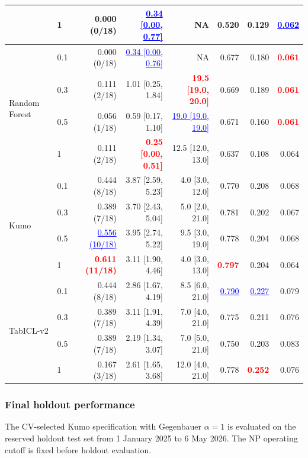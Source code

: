 \documentclass[a4paper,fleqn]{cas-sc}
\begin{document}
\begin{table}[pos=!htbp,align=\centering]
{\begin{tabular}{llrrrrrr}
 & 1 & 0.000 (0/18) & \textcolor{blue}{\underline{0.34 [0.00, 0.77]}} & NA & 0.520 & 0.129 & \textcolor{blue}{\underline{0.062}} \\
\midrule
\multirow{4}{*}{Random Forest} & 0.1 & 0.000 (0/18) & \textcolor{blue}{\underline{0.34 [0.00, 0.76]}} & NA & 0.677 & 0.180 & \textcolor{red}{\textbf{0.061}} \\
 & 0.3 & 0.111 (2/18) & 1.01 [0.25, 1.84] & \textcolor{red}{\textbf{19.5 [19.0, 20.0]}} & 0.669 & 0.189 & \textcolor{red}{\textbf{0.061}} \\
 & 0.5 & 0.056 (1/18) & 0.59 [0.17, 1.10] & \textcolor{blue}{\underline{19.0 [19.0, 19.0]}} & 0.671 & 0.160 & \textcolor{red}{\textbf{0.061}} \\
 & 1 & 0.111 (2/18) & \textcolor{red}{\textbf{0.25 [0.00, 0.51]}} & 12.5 [12.0, 13.0] & 0.637 & 0.108 & 0.064 \\
\midrule
\multirow{4}{*}{Kumo} & 0.1 & 0.444 (8/18) & 3.87 [2.59, 5.23] & 4.0 [3.0, 12.0] & 0.770 & 0.208 & 0.068 \\
 & 0.3 & 0.389 (7/18) & 3.70 [2.43, 5.04] & 5.0 [2.0, 21.0] & 0.781 & 0.202 & 0.067 \\
 & 0.5 & \textcolor{blue}{\underline{0.556 (10/18)}} & 3.95 [2.74, 5.22] & 9.5 [3.0, 19.0] & 0.778 & 0.204 & 0.068 \\
 & 1 & \textcolor{red}{\textbf{0.611 (11/18)}} & 3.11 [1.90, 4.46] & 4.0 [3.0, 13.0] & \textcolor{red}{\textbf{0.797}} & 0.204 & 0.064 \\
\midrule
\multirow{4}{*}{TabICL-v2} & 0.1 & 0.444 (8/18) & 2.86 [1.67, 4.19] & 8.5 [6.0, 21.0] & \textcolor{blue}{\underline{0.790}} & \textcolor{blue}{\underline{0.227}} & 0.079 \\
 & 0.3 & 0.389 (7/18) & 3.11 [1.91, 4.39] & 7.0 [4.0, 21.0] & 0.775 & 0.211 & 0.076 \\
 & 0.5 & 0.389 (7/18) & 2.19 [1.34, 3.07] & 7.0 [5.0, 21.0] & 0.750 & 0.203 & 0.083 \\
 & 1 & 0.167 (3/18) & 2.61 [1.65, 3.68] & 12.0 [4.0, 21.0] & 0.778 & \textcolor{red}{\textbf{0.252}} & 0.076 \\
\bottomrule
\end{tabular}
}
\end{table}

\subsubsection{Final holdout performance}
\label{sec:holdout_results}

The CV-selected Kumo specification with Gegenbauer $\alpha=1$ is evaluated on the reserved holdout test set from 1 January 2025 to 6 May 2026. The NP operating cutoff is fixed before holdout evaluation.
\end{document}
